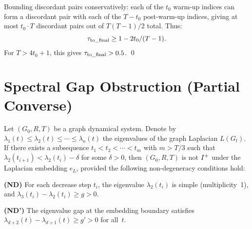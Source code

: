\documentclass{../shared/primo}
\begin{document}
Bounding discordant pairs conservatively: each of the $t_0$ warm-up indices can form a discordant pair with each of the $T - t_0$ post-warm-up indices, giving at most $t_0 \cdot T$ discordant pairs out of $T(T-1)/2$ total. Thus:
\[
\tau_{\mathrm{to\_final}} \geq 1 - 2t_0 / (T - 1).
\]
For $T > 4t_0 + 1$, this gives $\tau_{\mathrm{to\_final}} > 0.5$. \qed


\section{Spectral Gap Obstruction (Partial Converse)}
\label{sec:converse}

\begin{theorem}\label{thm:obstruction}
Let $(G_0, R, T)$ be a graph dynamical system. Denote by $\lambda_1(t) \leq \lambda_2(t) \leq \cdots \leq \lambda_n(t)$ the eigenvalues of the graph Laplacian $L(G_t)$. If there exists a subsequence $t_1 < t_2 < \cdots < t_m$ with $m > T/3$ such that $\lambda_2(t_{i+1}) < \lambda_2(t_i) - \delta$ for some $\delta > 0$, then $(G_0, R, T)$ is not $I\textsuperscript{+}$ under the Laplacian embedding $e_L$, provided the following non-degeneracy conditions hold:

\textbf{(ND)} For each decrease step $t_i$, the eigenvalue $\lambda_2(t_i)$ is simple (multiplicity~1), and $\lambda_3(t_i) - \lambda_2(t_i) \geq g > 0$.

\textbf{(ND')} The eigenvalue gap at the embedding boundary satisfies $\lambda_{d+2}(t) - \lambda_{d+1}(t) \geq g' > 0$ for all~$t$.
\end{theorem}
\end{document}
